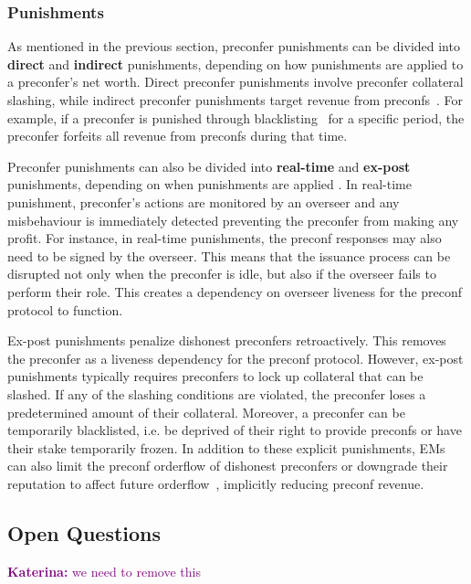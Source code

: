 \documentclass[a4paper]{article}
\theoremstyle{boldstyle}
\newcommand{\ks}[1]{\textcolor{purple}{\textbf{Katerina:} #1}}
\newcommand{\todoqb}[1]{\todo[color=red!40]{\textbf{Quentin:} #1}}
\begin{document}
    \subsubsection{Punishments} \label{punishments}
    \todoqb{do we want to do a 2x2 summary table?}
    
    As mentioned in the previous section, preconfer punishments can be divided into \textbf{direct} and \textbf{indirect} punishments, depending on how punishments are applied to a preconfer's net worth. Direct preconfer punishments involve preconfer collateral slashing, while indirect preconfer punishments target revenue from preconfs~\cite{W:PreconfirmationFairExchange}. For example, if a preconfer is punished through blacklisting~\cite{W:PreconfirmationFairExchange} for a specific period, the preconfer forfeits all revenue from preconfs during that time.
    
    Preconfer punishments can also be divided into \textbf{real-time} and \textbf{ex-post} punishments, depending on when punishments are applied \cite{W:PreconfirmationFairExchange}. In real-time punishment, preconfer's actions are monitored by an overseer and any misbehaviour is immediately detected preventing the preconfer from making any profit. For instance, in real-time punishments, the preconf responses may also need to be signed by the overseer. This means that the issuance process can be disrupted not only when the preconfer is idle, but also if the overseer fails to perform their role. This creates a dependency on overseer liveness for the preconf protocol to function.
    
    Ex-post punishments penalize dishonest preconfers retroactively. This removes the preconfer as a liveness dependency for the preconf protocol. However, ex-post punishments typically requires preconfers to lock up collateral that can be slashed. If any of the slashing conditions are violated, the preconfer loses a predetermined amount of their collateral. Moreover, a preconfer can be temporarily blacklisted, i.e. be deprived of their right to provide preconfs or have their stake temporarily frozen. In addition to these explicit punishments, EMs can also limit the preconf orderflow of dishonest preconfers or downgrade their reputation to affect future orderflow~\cite{W:PreconfirmationFairExchange,W:User-DefinedPenalties:EnsuringHonestPreconfBehavior}, implicitly reducing preconf revenue.

\subsection{Open Questions}
\ks{we need to remove this}
\end{document}
